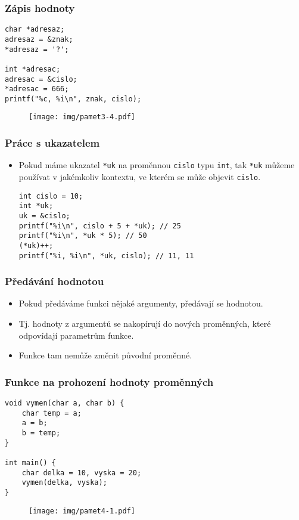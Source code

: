 \documentclass{beamer}
\newenvironment{itemizey}%
  {\large \begin{itemize}%
    \setlength{\itemsep}{6pt}%
    \setlength{\parskip}{6pt}}%
  {\end{itemize}}
\newenvironment{itemizex}%
  {\large \begin{itemize}%
    \setlength{\itemsep}{8pt}%
    \setlength{\parskip}{8pt}}%
  {\end{itemize}}
\begin{document}
\begin{frame}[t,fragile]\frametitle{Zápis hodnoty} 
\begin{verbatim} 
char *adresaz; 
adresaz = &znak;
*adresaz = '?';

int *adresac; 
adresac = &cislo;
*adresac = 666;
printf("%c, %i\n", znak, cislo);
\end{verbatim}

\begin{figure}[htb]
    \centering
    \texttt{[image: img/pamet3-4.pdf]}
\end{figure}
\end{frame}


\begin{frame}[t,fragile]\frametitle{Práce s ukazatelem} 
\begin{itemizex}
    \item Pokud máme ukazatel \texttt{*uk} na proměnnou \texttt{cislo} typu \texttt{int}, tak \texttt{*uk} můžeme používat v jakémkoliv kontextu, ve kterém se může objevit \texttt{cislo}.
\begin{verbatim} 
int cislo = 10;
int *uk; 
uk = &cislo;
printf("%i\n", cislo + 5 + *uk); // 25
printf("%i\n", *uk * 5); // 50
(*uk)++;
printf("%i, %i\n", *uk, cislo); // 11, 11
\end{verbatim}
\end{itemizex}
\end{frame}


\begin{frame}[t,fragile]\frametitle{Předávání hodnotou} 
    \begin{itemizey}
        \item Pokud předáváme funkci nějaké argumenty, předávají se hodnotou.
        \item Tj. hodnoty z argumentů se nakopírují do nových proměnných, které odpovídají parametrům funkce.
        \item Funkce tam nemůže změnit původní proměnné. 
    \end{itemizey}
\end{frame}


\begin{frame}[t,fragile]\frametitle{Funkce na prohození hodnoty proměnných} 
    \begin{verbatim} 
void vymen(char a, char b) {
    char temp = a;
    a = b;
    b = temp;
}

int main() {
    char delka = 10, vyska = 20;
    vymen(delka, vyska);
}
    \end{verbatim}

\begin{figure}[htb]
    \centering
    \texttt{[image: img/pamet4-1.pdf]}
\end{figure}
\end{frame}
\end{document}

